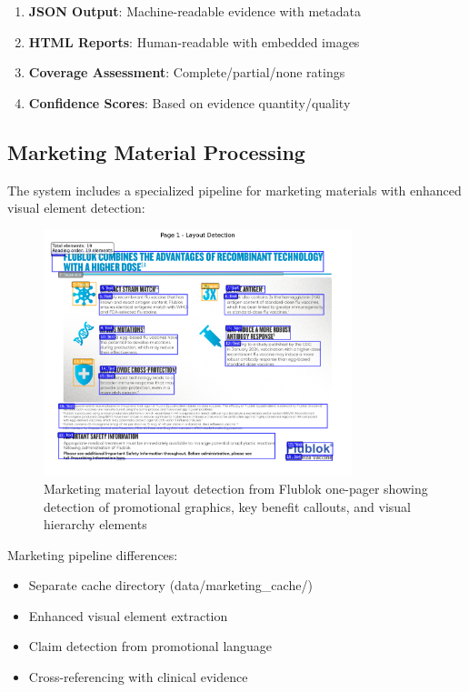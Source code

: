 \documentclass[11pt]{article}
\begin{document}
\begin{enumerate}[leftmargin=*,topsep=0pt,itemsep=0pt]
\item \textbf{JSON Output}: Machine-readable evidence with metadata
\item \textbf{HTML Reports}: Human-readable with embedded images
\item \textbf{Coverage Assessment}: Complete/partial/none ratings
\item \textbf{Confidence Scores}: Based on evidence quantity/quality
\end{enumerate}

\subsection{Marketing Material Processing}

The system includes a specialized pipeline for marketing materials with enhanced visual element detection:

\begin{figure}[htbp]
\centering
\includegraphics[width=0.8\textwidth]{marketing_layout_example.png}
\caption{Marketing material layout detection from Flublok one-pager showing detection of promotional graphics, key benefit callouts, and visual hierarchy elements}
\end{figure}

Marketing pipeline differences:
\begin{itemize}[leftmargin=*,topsep=0pt,itemsep=0pt]
\item Separate cache directory (data/marketing\_cache/)
\item Enhanced visual element extraction
\item Claim detection from promotional language
\item Cross-referencing with clinical evidence
\end{itemize}
\end{document}
